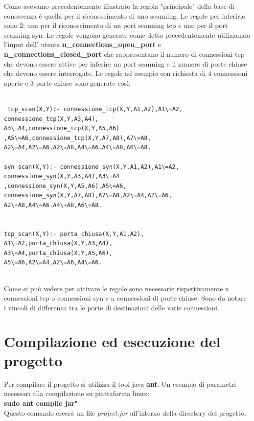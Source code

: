 \documentclass[a4paper,12pt]{article} %
\begin{document}
Come avevamo precedentemente illustrato la regola "principale" della base di conoscenza è quella per il riconoscimento
di uno scanning. Le regole per inferirlo sono 2: una per il riconoscimento di un port scanning tcp e uno per il port scanning
syn. Le regole vengono generate come detto precedentemente utilizzando l'input dell' utente \textbf{n\_connections\_open\_port} e \textbf{n\_connections\_closed\_port} che rappresentano il numero di connessioni tcp che devono essere attive per inferire un port scanning e il numero di porte chiuse che devono essere interrogate.
Le regole ad esempio con richiesta di 4 connessioni aperte e 3 porte chiuse sono generate così:\\


\begin{lstlisting}

 tcp_scan(X,Y):- connessione_tcp(X,Y,A1,A2),A1\=A2,
connessione_tcp(X,Y,A3,A4),
A3\=A4,connessione_tcp(X,Y,A5,A6)
,A5\=A6,connessione_tcp(X,Y,A7,A8),A7\=A8,
A2\=A4,A2\=A6,A2\=A8,A4\=A6.A4\=A8,A6\=A8.

syn_scan(X,Y):- connessione_syn(X,Y,A1,A2),A1\=A2,
connessione_syn(X,Y,A3,A4),A3\=A4
,connessione_syn(X,Y,A5,A6),A5\=A6,
connessione_syn(X,Y,A7,A8),A7\=A8,A2\=A4,A2\=A6,
A2\=A8,A4\=A6.A4\=A8,A6\=A8.
 

tcp_scan(X,Y):- porta_chiusa(X,Y,A1,A2),
A1\=A2,porta_chiusa(X,Y,A3,A4),
A3\=A4,porta_chiusa(X,Y,A5,A6),
A5\=A6,A2\=A4,A2\=A6,A4\=A6.


\end{lstlisting}



Come si può vedere per attivare le regole sono necessarie rispettivamente n connessioni tcp o connessioni syn e n
connessioni di porte chiuse. Sono da notare i vincoli di differenza tra le porte di destinazioni delle varie connessioni.




\section{Compilazione ed esecuzione del progetto}

Per compilare il progetto si utilizza il tool java \textbf{ant}. Un esempio 
di parametri necessari alla compilazione su piattaforma linux:\\

\textbf{sudo ant compile jar"}\\

Questo comando creerà un file \emph{project.jar} all'interno della directory del progetto.\\
\end{document}
